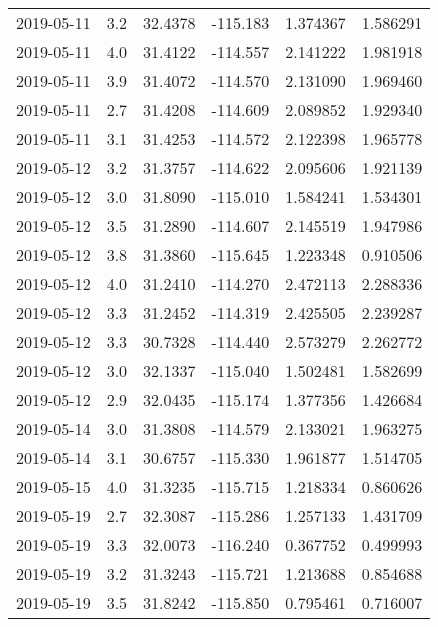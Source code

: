 \begin{tabular}{lrrrrr}
2019-05-11 &       3.2 &  32.4378 &  -115.183 &         1.374367 &         1.586291 \\
2019-05-11 &       4.0 &  31.4122 &  -114.557 &         2.141222 &         1.981918 \\
2019-05-11 &       3.9 &  31.4072 &  -114.570 &         2.131090 &         1.969460 \\
2019-05-11 &       2.7 &  31.4208 &  -114.609 &         2.089852 &         1.929340 \\
2019-05-11 &       3.1 &  31.4253 &  -114.572 &         2.122398 &         1.965778 \\
2019-05-12 &       3.2 &  31.3757 &  -114.622 &         2.095606 &         1.921139 \\
2019-05-12 &       3.0 &  31.8090 &  -115.010 &         1.584241 &         1.534301 \\
2019-05-12 &       3.5 &  31.2890 &  -114.607 &         2.145519 &         1.947986 \\
2019-05-12 &       3.8 &  31.3860 &  -115.645 &         1.223348 &         0.910506 \\
2019-05-12 &       4.0 &  31.2410 &  -114.270 &         2.472113 &         2.288336 \\
2019-05-12 &       3.3 &  31.2452 &  -114.319 &         2.425505 &         2.239287 \\
2019-05-12 &       3.3 &  30.7328 &  -114.440 &         2.573279 &         2.262772 \\
2019-05-12 &       3.0 &  32.1337 &  -115.040 &         1.502481 &         1.582699 \\
2019-05-12 &       2.9 &  32.0435 &  -115.174 &         1.377356 &         1.426684 \\
2019-05-14 &       3.0 &  31.3808 &  -114.579 &         2.133021 &         1.963275 \\
2019-05-14 &       3.1 &  30.6757 &  -115.330 &         1.961877 &         1.514705 \\
2019-05-15 &       4.0 &  31.3235 &  -115.715 &         1.218334 &         0.860626 \\
2019-05-19 &       2.7 &  32.3087 &  -115.286 &         1.257133 &         1.431709 \\
2019-05-19 &       3.3 &  32.0073 &  -116.240 &         0.367752 &         0.499993 \\
2019-05-19 &       3.2 &  31.3243 &  -115.721 &         1.213688 &         0.854688 \\
2019-05-19 &       3.5 &  31.8242 &  -115.850 &         0.795461 &         0.716007 \\

\end{tabular}
